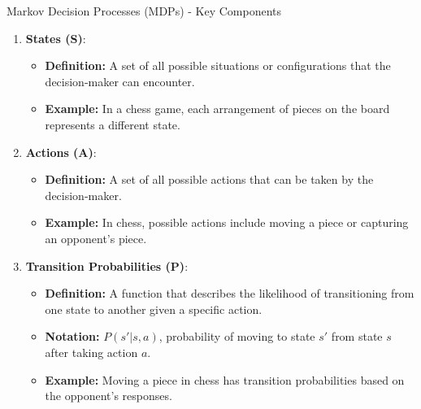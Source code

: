 \documentclass[aspectratio=169]{beamer}
\begin{document}
\begin{frame}[fragile]{Markov Decision Processes (MDPs) - Key Components}
    \begin{enumerate}
        \item \textbf{States (S)}:
            \begin{itemize}
                \item \textbf{Definition:} A set of all possible situations or configurations that the decision-maker can encounter.
                \item \textbf{Example:} In a chess game, each arrangement of pieces on the board represents a different state.
            \end{itemize}
            
        \item \textbf{Actions (A)}:
            \begin{itemize}
                \item \textbf{Definition:} A set of all possible actions that can be taken by the decision-maker.
                \item \textbf{Example:} In chess, possible actions include moving a piece or capturing an opponent's piece.
            \end{itemize}

        \item \textbf{Transition Probabilities (P)}:
            \begin{itemize}
                \item \textbf{Definition:} A function that describes the likelihood of transitioning from one state to another given a specific action.
                \item \textbf{Notation:} \( P(s'|s, a) \), probability of moving to state \( s' \) from state \( s \) after taking action \( a \).
                \item \textbf{Example:} Moving a piece in chess has transition probabilities based on the opponent's responses.
            \end{itemize}
    \end{enumerate}
\end{frame}
\end{document}

